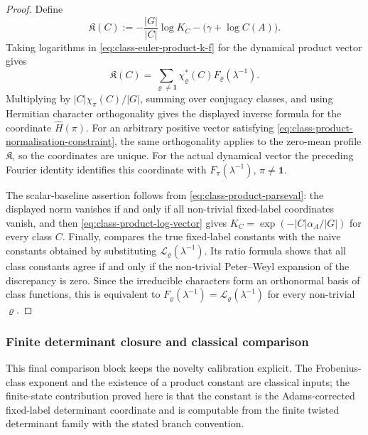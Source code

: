 \documentclass[11pt,a4paper]{amsart}
\theoremstyle{plain}
\theoremstyle{definition}
\theoremstyle{remark}
\begin{document}
\begin{proof}
  Define
  \[
    \mathfrak K(C):=
    -\frac{|G|}{|C|}\log K_C-\bigl(\gamma+\log C(A)\bigr).
  \]
  Taking logarithms in \eqref{eq:class-euler-product-k-f} for the dynamical
  product vector gives
  \[
    \mathfrak K(C)=
    \sum_{\varrho\ne\mathbf1}
      \chi_\varrho^\ast(C)F_\varrho(\lambda^{-1}).
  \]
  Multiplying by \(|C|\chi_\pi(C)/|G|\), summing over conjugacy classes,
  and using Hermitian character orthogonality gives the displayed inverse
  formula for the coordinate \(\widehat H(\pi)\).  For an arbitrary positive
  vector satisfying \eqref{eq:class-product-normalisation-constraint}, the
  same orthogonality applies to the zero-mean profile \(\mathfrak K\), so
  the coordinates are unique.  For the actual dynamical vector the preceding
  Fourier identity identifies this coordinate with
  \(F_\pi(\lambda^{-1})\), \(\pi\ne\mathbf1\).

  The scalar-baseline assertion follows from
  \eqref{eq:class-product-parseval}: the displayed norm vanishes if and
  only if all non-trivial fixed-label coordinates vanish, and then
  \eqref{eq:class-product-log-vector} gives
  \(K_C=\exp(-|C|\alpha_A/|G|)\) for every class \(C\).  Finally,
   compares the true fixed-label
  constants with the naive constants obtained by substituting
  \(\mathcal L_\varrho(\lambda^{-1})\).  Its ratio formula shows that all
  class constants agree if and only if the non-trivial Peter--Weyl expansion
  of the discrepancy is zero.  Since the irreducible characters form an
  orthonormal basis of class functions, this is equivalent to
  \(F_\varrho(\lambda^{-1})=\mathcal L_\varrho(\lambda^{-1})\) for every
  non-trivial \(\varrho\).
\end{proof}
\subsubsection{Finite determinant closure and classical comparison}
\label{subsubsec:finite-determinant-closure-classical-comparison}

This final comparison block keeps the novelty calibration explicit.  The
Frobenius-class exponent and the existence of a product constant are classical
inputs; the finite-state contribution proved here is that the constant is the
Adams-corrected fixed-label determinant coordinate and is computable from the
finite twisted determinant family with the stated branch convention.
\end{document}
